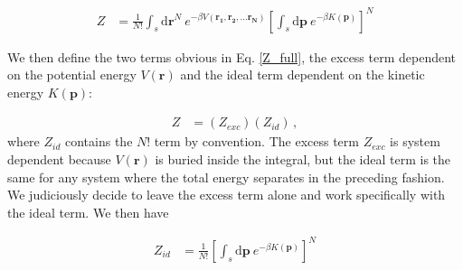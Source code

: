 \documentclass[12pt]{article}
\newcommand*{\diff}{\mathrm{d}}
\begin{document}
\begin{align}
    Z &= \frac{1}{N!}\int_s \diff\mathbf{r}^N ~e^{-\beta V(\mathbf{r_1}, \mathbf{r_2}, \dots \mathbf{r_N})} \left[\int_s \diff\mathbf{p}~e^{-\beta K(\mathbf{p})}\right]^{N}
    \label{Z_full}
\end{align}

We then define the two terms obvious in Eq. \ref{Z_full}, the excess term dependent on the potential energy $V(\mathbf{r})$ and the ideal term dependent on the kinetic energy $K(\mathbf{p})$: 

\begin{align}
    Z &= (Z_{exc})(Z_{id}) \,,
\end{align}
where $Z_{id}$ contains the $N!$ term by convention. The excess term $Z_{exc}$ is system dependent because $V(\mathbf{r})$ is buried inside the integral, but the ideal term is the same for any system where the total energy separates in the preceding fashion. We judiciously decide to leave the excess term alone and work specifically with the ideal term. We then have

\begin{align}
    Z_{id} &=  \frac{1}{N!}\left[\int_s \diff\mathbf{p} ~e^{-\beta K(\mathbf{p})}\right]^{N}
\end{align}
\end{document}
